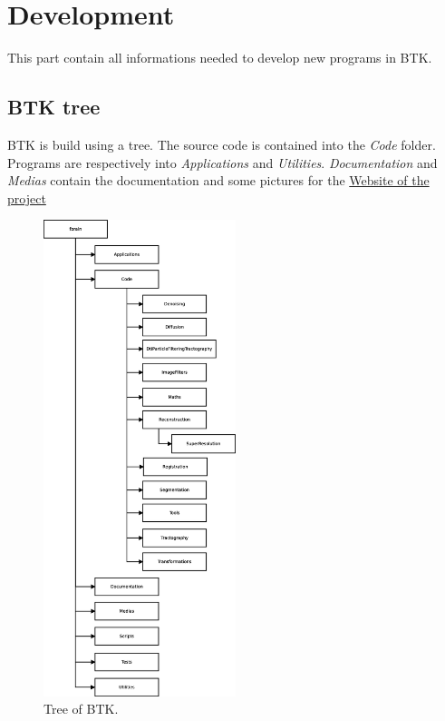     \section{Development}
    This part contain all informations needed to develop new programs in BTK.

    \subsection{BTK tree}
    BTK is build using a tree.
    The source code is contained into the \textit{Code} folder.
    Programs are respectively into \textit{Applications} and \textit{Utilities}.
    \textit{Documentation} and \textit{Medias} contain the documentation and some pictures for the \href{http://rousseau.github.com/fbrain/}{Website of the project}

    \begin{figure}[H]
     \centering
      \includegraphics[width=0.5\textwidth]{Btk_tree.eps}
      \caption{Tree of BTK.}
    \end{figure}

